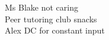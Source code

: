 \documentclass[preview]{standalone}
\begin{document}
Ms Blake not caring\\Peer tutoring club snacks\\Alex DC for constant input\\
\end{document}

